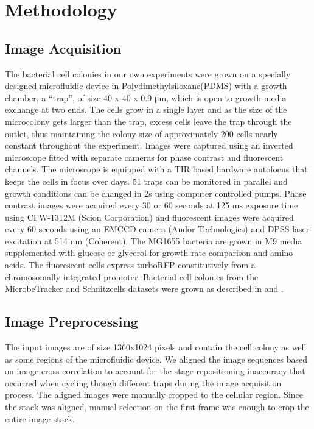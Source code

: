 \documentclass[journal]{IEEEtran}
\begin{document}
\section{Methodology}
\subsection{Image Acquisition}
The bacterial cell colonies in our own experiments were grown on a specially designed microfluidic device in Polydimethylsiloxane(PDMS)\cite {ullmanhigh2012} with a growth chamber, a “trap”, of size 40 x 40 x 0.9 μm, which is open to growth media exchange at two ends.  The cells grow in a single layer and as the size of the microcolony gets larger than the trap, excess cells leave the trap through the outlet, thus maintaining the colony size of approximately 200 cells nearly constant throughout the experiment. Images were captured using an inverted microscope fitted with separate cameras for phase contrast and fluorescent channels. The microscope is equipped with a TIR based hardware autofocus that keeps the cells in focus over days. 51 traps can be monitored in parallel and growth conditions can be changed in 2s \cite{hammarlac2012} using computer controlled pumps. Phase contrast images were acquired every 30 or 60 seconds at 125 ms exposure time using CFW-1312M (Scion Corporation) and fluorescent images were acquired every 60 seconds using an EMCCD camera (Andor Technologies) and DPSS laser excitation at 514 nm (Coherent). The MG1655 bacteria are grown in M9 media supplemented with glucose or glycerol for growth rate comparison and amino acids. The fluorescent cells express turboRFP constitutively from a chromosomally integrated promoter. Bacterial cell colonies from the MicrobeTracker and Schnitzcells datasets were grown as described in \cite {sliusarenkohigh2011} and \cite {youngmeasuring2012}.

\subsection{Image Preprocessing }
The input images are of size 1360x1024 pixels and contain the cell colony as well as some regions of the microfluidic device. We aligned the image sequences based on image cross correlation to account for the stage repositioning inaccuracy that occurred when cycling though different traps during the image acquisition process. The aligned images were manually cropped to the cellular region. Since the stack was aligned, manual selection on the first frame was enough to crop the entire image stack.
\end{document}
